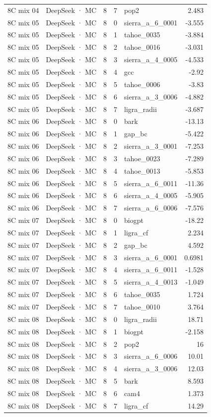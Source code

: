 \begin{tabular}{llrrlr}
8C mix 04 & DeepSeek · MC & 8 & 7 & pop2 & 2.483 \\
8C mix 05 & DeepSeek · MC & 8 & 0 & sierra\_a\_6\_0001 & -3.555 \\
8C mix 05 & DeepSeek · MC & 8 & 1 & tahoe\_0035 & -3.884 \\
8C mix 05 & DeepSeek · MC & 8 & 2 & tahoe\_0016 & -3.031 \\
8C mix 05 & DeepSeek · MC & 8 & 3 & sierra\_a\_4\_0005 & -4.533 \\
8C mix 05 & DeepSeek · MC & 8 & 4 & gcc & -2.92 \\
8C mix 05 & DeepSeek · MC & 8 & 5 & tahoe\_0006 & -3.83 \\
8C mix 05 & DeepSeek · MC & 8 & 6 & sierra\_a\_3\_0006 & -4.882 \\
8C mix 05 & DeepSeek · MC & 8 & 7 & ligra\_radii & -3.687 \\
8C mix 06 & DeepSeek · MC & 8 & 0 & bark & -13.13 \\
8C mix 06 & DeepSeek · MC & 8 & 1 & gap\_bc & -5.422 \\
8C mix 06 & DeepSeek · MC & 8 & 2 & sierra\_a\_3\_0001 & -7.253 \\
8C mix 06 & DeepSeek · MC & 8 & 3 & tahoe\_0023 & -7.289 \\
8C mix 06 & DeepSeek · MC & 8 & 4 & tahoe\_0013 & -5.853 \\
8C mix 06 & DeepSeek · MC & 8 & 5 & sierra\_a\_6\_0011 & -11.36 \\
8C mix 06 & DeepSeek · MC & 8 & 6 & sierra\_a\_4\_0005 & -5.905 \\
8C mix 06 & DeepSeek · MC & 8 & 7 & sierra\_a\_6\_0006 & -7.576 \\
8C mix 07 & DeepSeek · MC & 8 & 0 & biogpt & -18.22 \\
8C mix 07 & DeepSeek · MC & 8 & 1 & ligra\_cf & 2.234 \\
8C mix 07 & DeepSeek · MC & 8 & 2 & gap\_bc & 4.592 \\
8C mix 07 & DeepSeek · MC & 8 & 3 & sierra\_a\_6\_0001 & 0.6981 \\
8C mix 07 & DeepSeek · MC & 8 & 4 & sierra\_a\_6\_0011 & -1.528 \\
8C mix 07 & DeepSeek · MC & 8 & 5 & sierra\_a\_4\_0013 & -1.049 \\
8C mix 07 & DeepSeek · MC & 8 & 6 & tahoe\_0035 & 1.724 \\
8C mix 07 & DeepSeek · MC & 8 & 7 & tahoe\_0010 & 3.764 \\
8C mix 08 & DeepSeek · MC & 8 & 0 & ligra\_radii & 18.71 \\
8C mix 08 & DeepSeek · MC & 8 & 1 & biogpt & -2.158 \\
8C mix 08 & DeepSeek · MC & 8 & 2 & pop2 & 16 \\
8C mix 08 & DeepSeek · MC & 8 & 3 & sierra\_a\_6\_0006 & 10.01 \\
8C mix 08 & DeepSeek · MC & 8 & 4 & sierra\_a\_3\_0006 & 12.03 \\
8C mix 08 & DeepSeek · MC & 8 & 5 & bark & 8.593 \\
8C mix 08 & DeepSeek · MC & 8 & 6 & cam4 & 1.373 \\
8C mix 08 & DeepSeek · MC & 8 & 7 & ligra\_cf & 14.29 \\
\bottomrule
\end{tabular}

